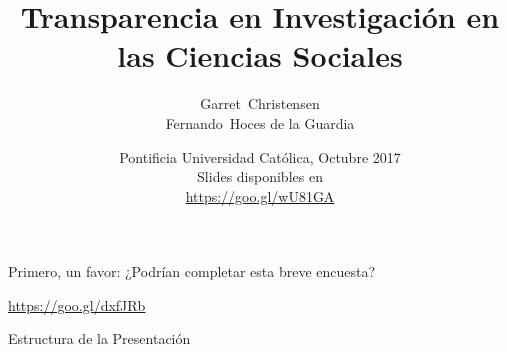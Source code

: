 \documentclass{beamer}
\title[Transparencia en Investigación en las Ciencias Sociales] %
{Transparencia en Investigación en las Ciencias Sociales}
\subtitle
{}
\author[] %
{Garret~Christensen\inst{1}\inst{2}\\
Fernando~Hoces de la Guardia\inst{1}}
\institute[Universities of Somewhere and Elsewhere] %
{
  \inst{1}%
  UC Berkeley:\\
  Berkeley Initiative for Transparency in the Social Sciences\\
  \inst{2}%
  Berkeley Institute for Data Sciences\\
}
\date[BITSS2017] %
{Pontificia Universidad Católica, Octubre 2017\\
Slides disponibles en \\ \url{https://goo.gl/wU81GA}}
\begin{document}
\begin{frame}
  \titlepage
\end{frame}






\begin{frame}
Primero, un favor: ¿Podrían completar esta breve encuesta?

\huge{\url{https://goo.gl/dxfJRb}}


\end{frame}

\begin{frame}{Estructura de la Presentación}
  \tableofcontents
\end{frame}
\end{document}
